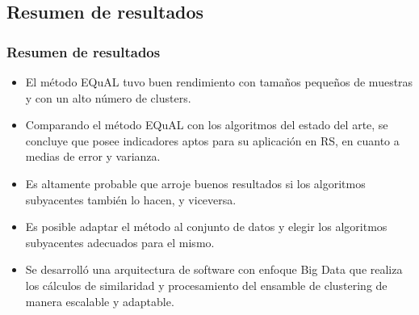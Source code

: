 \begin{frame}
\begin{figure}[h!]
{
		}
		\label{fig:performance1000}
	\end{figure}

\end{frame}

\subsection{Resumen de resultados}
\begin{frame}
	\frametitle{Resumen de resultados}
	\begin{itemize}
		\item El método EQuAL tuvo buen rendimiento con tamaños pequeños de muestras y con un alto número de clusters.
		\item Comparando el método EQuAL con los algoritmos del estado del arte, se concluye que posee indicadores aptos para su aplicación en RS, en cuanto a medias de error y varianza.
		\item Es altamente probable que arroje buenos resultados si los algoritmos subyacentes también lo hacen, y viceversa.
		\item Es posible adaptar el método al conjunto de datos y elegir los algoritmos subyacentes adecuados para el mismo.
		\item Se desarrolló una arquitectura de software con enfoque Big Data que realiza los cálculos de similaridad y procesamiento del ensamble de clustering de manera escalable y adaptable.
	\end{itemize}
\end{frame}